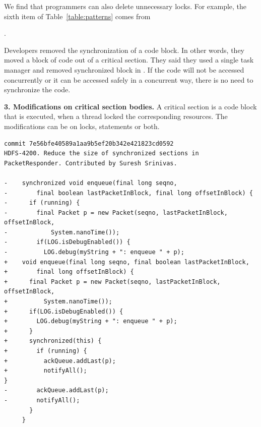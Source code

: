 We find that programmers can also delete unnecessary locks. For example, the sixth item of Table~\ref{table:patterns} comes from 

.


Developers removed the synchronization of a code block. In other words, they moved a block of code out of a critical section. They said they used a single task manager and removed synchronized block in . If the code will not be accessed concurrently or it can be accessed safely in a concurrent way, there is no need to synchronize the code.

\noindent
\textbf{3. Modifications on critical section bodies.} A critical section is a code block that is executed, when a thread locked the corresponding resources. The modifications can be on locks, statements or both.%




\begin{lstlisting}
commit 7e56bfe40589a1aa9b5ef20b342e421823cd0592
HDFS-4200. Reduce the size of synchronized sections in PacketResponder. Contributed by Suresh Srinivas.

-    synchronized void enqueue(final long seqno,
-        final boolean lastPacketInBlock, final long offsetInBlock) {
-      if (running) {
-        final Packet p = new Packet(seqno, lastPacketInBlock, offsetInBlock,
-            System.nanoTime());
-        if(LOG.isDebugEnabled()) {
-          LOG.debug(myString + ": enqueue " + p);
+    void enqueue(final long seqno, final boolean lastPacketInBlock,
+        final long offsetInBlock) {
+      final Packet p = new Packet(seqno, lastPacketInBlock, offsetInBlock,
+          System.nanoTime());
+      if(LOG.isDebugEnabled()) {
+        LOG.debug(myString + ": enqueue " + p);
+      }
+      synchronized(this) {
+        if (running) {
+          ackQueue.addLast(p);
+          notifyAll();
}
-        ackQueue.addLast(p);
-        notifyAll();
       }
     }
\end{lstlisting}

